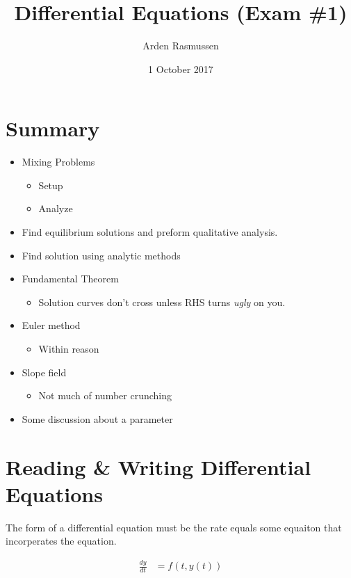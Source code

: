 \documentclass{article}
\title{Differential Equations (Exam \#1)}
\author{Arden Rasmussen}
\date{1 October 2017}
\begin{document}
\maketitle
\newpage
\tableofcontents
\newpage
{}

\section{Summary}\label{sec:summary}

\begin{itemize}
  \item Mixing Problems
    \begin{itemize}
      \item Setup
      \item Analyze
    \end{itemize}
  \item Find equilibrium solutions and preform qualitative analysis.
  \item Find solution using analytic methods
  \item Fundamental Theorem
    \begin{itemize}
      \item Solution curves don't cross unless RHS turns \textit{ugly} on you.
    \end{itemize}
  \item Euler method
    \begin{itemize}
      \item Within reason
    \end{itemize}
  \item Slope field
    \begin{itemize}
      \item Not much of number crunching
    \end{itemize}
  \item Some discussion about a parameter
\end{itemize}
\newpage

\section{Reading \& Writing Differential Equations}\label{sec:reading_writing_differential_equations}

The form of a differential equation must be the rate equals some equaiton that
incorperates the equation.

\begin{align}
  \frac{dy}{dt} &= f(t,y(t))
\end{align}
\end{document}
